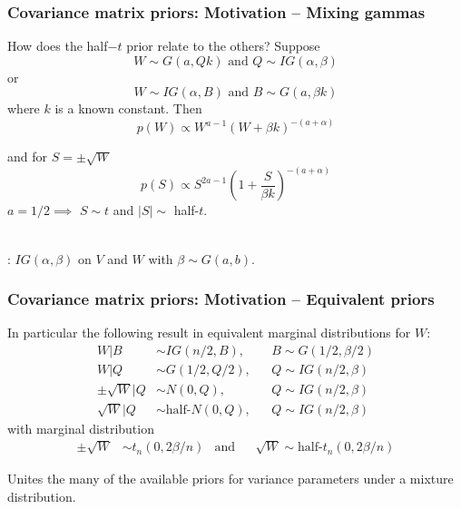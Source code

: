 \documentclass[xcolor=dvipsnames]{beamer}
\begin{document}


\begin{frame}
\frametitle{Covariance matrix priors: Motivation -- Mixing gammas}
How does the half$-t$ prior relate to the others? Suppose
\[
W\sim G(a,Qk) \mbox{ and } Q\sim IG(\alpha,\beta)
\]
or
\[
W\sim IG(\alpha, B) \mbox{ and } B\sim G(a,\beta k)
\]
where $k$ is a known constant. \pause Then
\[
p(W) \propto W^{a-1}(W + \beta k)^{-(a + \alpha)}
\]

and for $S=\pm\sqrt{W}$
\[
p(S) \propto S^{2a-1}\left(1 + \frac{S}{\beta k}\right)^{-(a + \alpha)}
\]
$a=1/2 \implies $ $S\sim t$ and $|S| \sim$ half-$t$.\\~

\pause \citet{huang2013simple}: $IG(\alpha,\beta)$ on $V$ and $W$ with $\beta\sim G(a,b)$.
\end{frame}

\begin{frame}
\frametitle{Covariance matrix priors: Motivation -- Equivalent priors}
In particular the following result in equivalent marginal distributions for $W$:
\begin{align*}
W|B &\sim IG(n/2,B), &&B\sim G(1/2,\beta/2)\\
W|Q &\sim G(1/2,Q/2), &&Q\sim IG(n/2,\beta)\\
\pm\sqrt{W}|Q &\sim N(0,Q), &&Q\sim IG(n/2,\beta)\\
\sqrt{W}|Q &\sim \mbox{half-}N(0,Q), &&Q\sim IG(n/2,\beta)
\end{align*}
with marginal distribution
\begin{align*}
\pm\sqrt{W} &\sim t_n(0,2\beta/n) &\mbox{and}&& \sqrt{W} \sim \mbox{half-}t_n(0,2\beta/n)
\end{align*}

\pause Unites the many of the available priors for variance parameters under a mixture distribution.
\end{frame}
\end{document}
